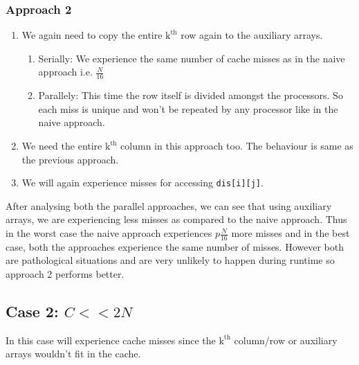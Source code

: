 \documentclass{article}
\begin{document}
\subsubsection{Approach 2}
\begin{enumerate}
    \item We again need to copy the entire $\mathrm{k}^{\mathrm{th}}$ row again to the auxiliary arrays.
    \begin{enumerate}
        \item Serially: We experience the same number of cache misses as in the naive approach i.e. $\frac{N}{16}$
        \item Parallely: This time the row itself is divided amongst the processors. So each miss is unique and won't be repeated by any processor like in the naive approach.
    \end{enumerate}
    \item We need the entire $\mathrm{k}^{\mathrm{th}}$ column in this approach too. The behaviour is same as the previous approach.
    \item We will again experience misses for accessing \texttt{dis[i][j]}.
\end{enumerate}
After analysing both the parallel approaches, we can see that using auxiliary arrays, we are experiencing less misses as compared to the naive approach. Thus in the worst case the naive approach experiences $p\frac{N}{16}$ more misses and in the best case, both the approaches experience the same number of misses. However both are pathological situations and are very unlikely to happen during runtime so approach 2 performs better.

\subsection{Case 2: $C << 2N$}
In this case will experience cache misses since the $\mathrm{k}^{\mathrm{th}}$ column/row or auxiliary arrays wouldn't fit in the cache.
\end{document}
